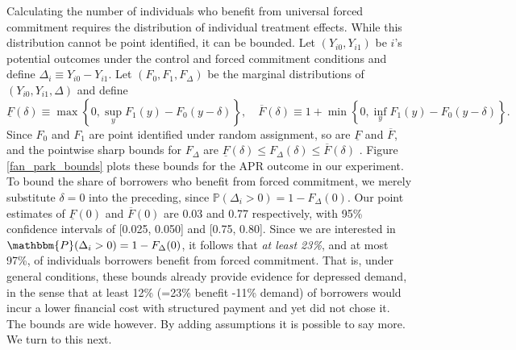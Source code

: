 \documentclass[12pt, a4paper]{article}
\begin{document}
Calculating the number of individuals who benefit from universal forced commitment requires the distribution of individual treatment effects.
While this distribution cannot be point identified, it can be bounded.
Let $(Y_{i0}, Y_{i1})$ be $i$'s potential outcomes under the control and forced commitment conditions and define $\Delta_i \equiv Y_{i0} - Y_{i1}$.
Let $(F_0, F_1, F_\Delta)$ be the marginal distributions of $(Y_{i0}, Y_{i1}, \Delta)$ and define 
\[
\underline{F}(\delta) \equiv \max \left\{0, \sup_y F_1(y) - F_0(y - \delta)  \right\}, \quad
\overline{F}(\delta) \equiv 1 + \min \left\{0, \inf_y F_1(y) - F_0(y-\delta) \right\}.
\]
Since $F_0$ and $F_1$ are point identified under random assignment, so are $\underline{F}$ and $\overline{F}$, and the pointwise sharp bounds for $F_\Delta$ are $\underline{F}(\delta) \leq F_\Delta(\delta) \leq \overline{F}(\delta)$ \citep{fan2010sharp}.
Figure \ref{fan_park_bounds} plots these bounds for the APR outcome in our experiment.  
To bound the share of borrowers who benefit from forced commitment, we merely substitute $\delta=0$ into the preceding, since $\mathbb{P}(\Delta_i > 0) = 1 - F_\Delta(0)$.
Our point estimates of $\underline{F}(0)$ and $\overline{F}(0)$ are 0.03 and 0.77 respectively, with 95\% confidence intervals of [0.025, 0.050] and [0.75, 0.80]. Since we are interested in $\mathbbm{P}(\Delta_i >0) = 1 - F_\Delta(0)$, it follows that \textit{at least 23\%}, and at most 97\%, of individuals borrowers benefit from forced commitment.%
That is, under general conditions, these bounds already provide evidence for depressed demand, in the sense that at least 12\% (=23\% benefit -11\% demand) of borrowers would incur a lower financial cost with structured payment and yet did not chose it. The bounds are wide however. By adding assumptions it is possible to say more. We turn to this next. %
\end{document}
